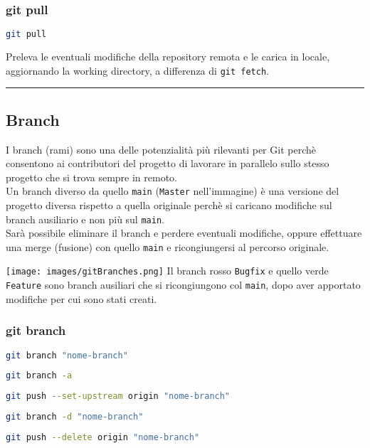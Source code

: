 \subsubsection{git pull}
\begin{lstlisting}[language=bash]
	git pull
\end{lstlisting}
Preleva le eventuali modifiche della repository remota e le carica in locale, aggiornando la working directory, a differenza di \texttt{git fetch}.\\



\hrule
\newpage
\subsection{Branch}
\nosyllab
\begin{minipage}{.48\textwidth}
	I branch (rami) sono una delle potenzialità più rilevanti per Git perchè consentono ai contributori del progetto di lavorare in parallelo sullo stesso progetto che si trova sempre in remoto.\\
	Un branch diverso da quello \texttt{main} (\texttt{Master} nell'immagine) è una versione del progetto diversa rispetto a quella originale perchè si caricano modifiche sul branch ausiliario e non più sul \texttt{main}.\\
	Sarà possibile eliminare il branch e perdere eventuali modifiche, oppure effettuare una merge (fusione) con quello \texttt{main} e ricongiungersi al percorso originale.
\end{minipage}
\hfil
\begin{minipage}{.48\textwidth}
	\texttt{[image: images/gitBranches.png]}
	Il branch rosso \texttt{Bugfix} e quello verde \texttt{Feature} sono branch ausiliari che si ricongiungono col \texttt{main}, dopo aver apportato modifiche per cui sono stati creati.
\end{minipage}
\syllab



\subsubsection{git branch}
\begin{lstlisting}[language=bash]
	git branch "nome-branch"
\end{lstlisting}
\begin{lstlisting}[language=bash]
	git branch -a
\end{lstlisting}
\begin{lstlisting}[language=bash]
	git push --set-upstream origin "nome-branch"
\end{lstlisting}
\begin{lstlisting}[language=bash]
	git branch -d "nome-branch"
\end{lstlisting}
\begin{lstlisting}[language=bash]
	git push --delete origin "nome-branch"
\end{lstlisting}

